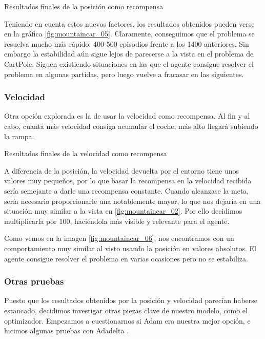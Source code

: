 %
       {Resultados finales de la posición como recompensa}

Teniendo en cuenta estos nuevos factores, los resultados obtenidos pueden verse en la gráfica \ref{fig:mountaincar_05}. Claramente, conseguimos que el problema se resuelva mucho más rápido: 400-500 episodios frente a los 1400 anteriores. Sin embargo la estabilidad aún sigue lejos de parecerse a la vista en el problema de CartPole. Siguen existiendo situaciones en las que el agente consigue resolver el problema en algunas partidas, pero luego vuelve a fracasar en las siguientes.


\subsubsection*{Velocidad}

Otra opción explorada es la de usar la velocidad como recompensa. Al fin y al cabo, cuanta más velocidad consiga acumular el coche, más alto llegará subiendo la rampa.

%
       {Resultados finales de la velocidad como recompensa}

A diferencia de la posición, la velocidad devuelta por el entorno tiene unos valores muy pequeños, por lo que basar la recompensa en la velocidad recibida sería semejante a darle una recompensa constante. Cuando alcanzase la meta, sería necesario proporcionarle una notablemente mayor, lo que nos dejaría en una situación muy similar a la vista en \ref{fig:mountaincar_02}. Por ello decidimos multiplicarla por 100, haciéndola más visible y relevante para el agente. 

Como vemos en la imagen \ref{fig:mountaincar_06}, nos encontramos con un comportamiento muy similar al visto usando la posición en valores absolutos. El agente consigue resolver el problema en varias ocasiones pero no se estabiliza.

\subsubsection*{Otras pruebas}

Puesto que los resultados obtenidos por la posición y velocidad parecían haberse estancado, decidimos investigar otras piezas clave de nuestro modelo, como el optimizador. Empezamos a cuestionarnos si Adam \citep{kingma2014adam} era nuestra mejor opción, e hicimos algunas pruebas con Adadelta \citep{NIPS2017_7003}.

